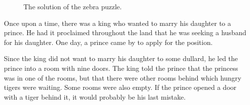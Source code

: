 \begin{figure}[!ht]
  \centering
  \caption{The solution of the zebra puzzle.}
  \label{fig:zebra}
\end{figure}


\pagebreak

\FloatBarrier


\exerciseEng
Once upon a time, there was a king who wanted to marry his daughter to a
prince. He had it proclaimed throughout the land that he was seeking a husband
for his daughter. One day, a prince came by to apply for the position. 

Since the king did not want to marry his daughter to some dullard, he led the
prince into a room with nine doors. The king told the prince that the princess
was in one of the rooms, but that there were other rooms behind which hungry
tigers were waiting. Some rooms were also empty. If the prince opened a door
with a tiger behind it, it would probably be his last mistake. 

